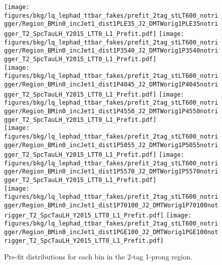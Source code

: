 \begin{figure}
    \centering
    \texttt{[image: figures/bkg/lq\_lephad\_ttbar\_fakes/prefit\_2tag\_stLT600\_notrigger/Region\_BMin0\_incJet1\_dist1PLE35\_J2\_DMTWorig1PLE35notrigger\_T2\_SpcTauLH\_Y2015\_LTT0\_L1\_Prefit.pdf]}
    \texttt{[image: figures/bkg/lq\_lephad\_ttbar\_fakes/prefit\_2tag\_stLT600\_notrigger/Region\_BMin0\_incJet1\_dist1P3540\_J2\_DMTWorig1P3540notrigger\_T2\_SpcTauLH\_Y2015\_LTT0\_L1\_Prefit.pdf]} \\
    \texttt{[image: figures/bkg/lq\_lephad\_ttbar\_fakes/prefit\_2tag\_stLT600\_notrigger/Region\_BMin0\_incJet1\_dist1P4045\_J2\_DMTWorig1P4045notrigger\_T2\_SpcTauLH\_Y2015\_LTT0\_L1\_Prefit.pdf]}
    \texttt{[image: figures/bkg/lq\_lephad\_ttbar\_fakes/prefit\_2tag\_stLT600\_notrigger/Region\_BMin0\_incJet1\_dist1P4550\_J2\_DMTWorig1P4550notrigger\_T2\_SpcTauLH\_Y2015\_LTT0\_L1\_Prefit.pdf]} \\
    \texttt{[image: figures/bkg/lq\_lephad\_ttbar\_fakes/prefit\_2tag\_stLT600\_notrigger/Region\_BMin0\_incJet1\_dist1P5055\_J2\_DMTWorig1P5055notrigger\_T2\_SpcTauLH\_Y2015\_LTT0\_L1\_Prefit.pdf]}
    \texttt{[image: figures/bkg/lq\_lephad\_ttbar\_fakes/prefit\_2tag\_stLT600\_notrigger/Region\_BMin0\_incJet1\_dist1P5570\_J2\_DMTWorig1P5570notrigger\_T2\_SpcTauLH\_Y2015\_LTT0\_L1\_Prefit.pdf]} \\
    \texttt{[image: figures/bkg/lq\_lephad\_ttbar\_fakes/prefit\_2tag\_stLT600\_notrigger/Region\_BMin0\_incJet1\_dist1P70100\_J2\_DMTWorig1P70100notrigger\_T2\_SpcTauLH\_Y2015\_LTT0\_L1\_Prefit.pdf]}
    \texttt{[image: figures/bkg/lq\_lephad\_ttbar\_fakes/prefit\_2tag\_stLT600\_notrigger/Region\_BMin0\_incJet1\_dist1PGE100\_J2\_DMTWorig1PGE100notrigger\_T2\_SpcTauLH\_Y2015\_LTT0\_L1\_Prefit.pdf]} \\
  \caption{Pre-fit \mtw distributions for each \pT bin in the 2-tag 1-prong region.}
  \label{fig:lq_ttbarfake_mtw_1p_prefit}
\end{figure}

